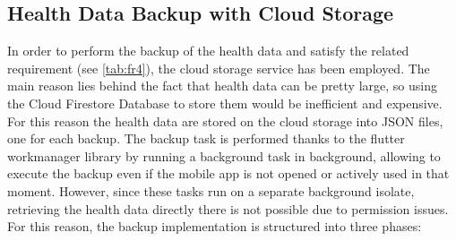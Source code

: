 \subsection{Health Data Backup with Cloud Storage}
In order to perform the backup of the health data and satisfy the related requirement (see \cref{tab:fr4}), the cloud storage service has been employed. The main reason lies behind the fact that health data can be pretty large, so using the Cloud Firestore Database to store them would be inefficient and expensive. For this reason the health data are stored on the cloud storage into JSON files, one for each backup. The backup task is performed thanks to the flutter workmanager library by running a background task in background, allowing to execute the backup even if the mobile app is not opened or actively used in that moment. However, since these tasks run on a separate background isolate, retrieving the health data directly there is not possible due to permission issues.
\noindent For this reason, the backup implementation is structured into three phases:
